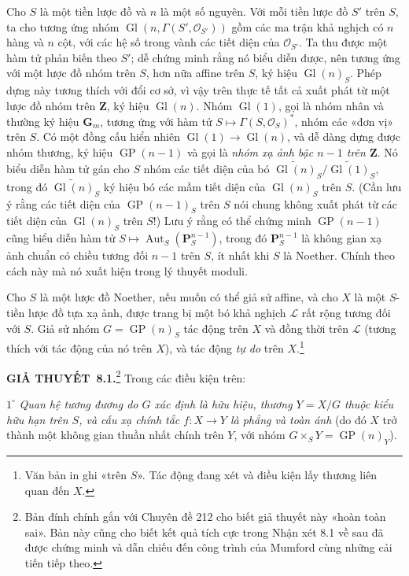 \documentclass[11pt,twoside,openany]{book}
\numberwithin{equation}{section}
\newcommand{\src}[1]{%
  \phantomsection\hypertarget{src:\fgasourceid:#1}{}%
  \marginpar{\raggedleft\footnotesize\sffamily #1}%
}
\newcommand{\fgasourceid}{unset}
\newcommand{\result}[2]{\par\medskip\noindent\textbf{#1\if\relax\detokenize{#2}\relax\else\ #2\fi.}\quad}
\begin{document}
Cho $S$ là một tiền lược đồ và $n$ là một số nguyên. Với mỗi tiền lược đồ $S'$
trên $S$, ta cho tương ứng nhóm
$\operatorname{Gl}(n,\Gamma(S',\mathcal O_{S'}))$ gồm các ma trận khả nghịch có
$n$ hàng và $n$ cột, với các hệ số trong vành các tiết diện của
$\mathcal O_{S'}$. Ta thu được một hàm tử phản biến theo $S'$; dễ chứng minh
rằng nó biểu diễn được, nên tương ứng với một lược đồ nhóm trên $S$, hơn nữa
affine trên $S$, ký hiệu $\operatorname{Gl}(n)_S$. Phép dựng này tương thích
với đổi cơ sở, vì vậy trên thực tế tất cả xuất phát từ một lược đồ nhóm trên
$\mathbf Z$, ký hiệu $\operatorname{Gl}(n)$. Nhóm $\operatorname{Gl}(1)$, gọi
là nhóm nhân và thường ký hiệu $\mathbf G_m$, tương ứng với hàm tử
$S\longmapsto\Gamma(S,\mathcal O_S)^*$, nhóm các «đơn vị» trên $S$. Có một
đồng cấu hiển nhiên $\operatorname{Gl}(1)\to\operatorname{Gl}(n)$, và dễ dàng
dựng được nhóm thương, ký hiệu $\operatorname{GP}(n-1)$ và gọi là
\emph{nhóm xạ ảnh bậc $n-1$ trên $\mathbf Z$}. Nó biểu diễn hàm tử gán cho
$S$ nhóm các tiết diện của bó
$\widetilde{\operatorname{Gl}(n)}_S/
\widetilde{\operatorname{Gl}(1)}_S$, trong đó
$\widetilde{\operatorname{Gl}(n)}_S$ ký hiệu bó các mầm tiết diện của
$\operatorname{Gl}(n)_S$ trên $S$. (Cần lưu ý rằng các tiết diện của
$\operatorname{GP}(n-1)_S$ trên $S$ nói chung không xuất phát từ các tiết diện
của $\operatorname{Gl}(n)_S$ trên $S$!) Lưu ý rằng có thể chứng minh
$\operatorname{GP}(n-1)$ cũng biểu diễn hàm tử
$S\longmapsto\operatorname{Aut}_S(\mathbf P_S^{n-1})$, trong đó
$\mathbf P_S^{n-1}$ là không gian xạ ảnh chuẩn có chiều tương đối $n-1$ trên
$S$, ít nhất khi $S$ là Noether. Chính theo cách này mà nó xuất hiện trong lý
thuyết moduli.

Cho $S$ là một lược đồ Noether, nếu muốn có thể giả sử affine, và cho $X$ là
một $S$-tiền lược đồ tựa xạ ảnh, được trang bị một bó khả nghịch $\mathcal L$
rất rộng tương đối với $S$. Giả sử nhóm $G=\operatorname{GP}(n)_S$ tác động
trên $X$ và đồng thời trên $\mathcal L$ (tương thích với tác động của nó trên
$X$), và tác động \emph{tự do} trên $X$.\footnote{Văn bản in ghi «trên $S$».
Tác động đang xét và điều kiện lấy thương liên quan đến $X$.}
\src{117}

\result{GIẢ THUYẾT}{8.1}\footnote{Bản đính chính gắn với Chuyên đề 212 cho
biết giả thuyết này «hoàn toàn sai». Bản này cũng cho biết kết quả tích cực
trong Nhận xét 8.1 về sau đã được chứng minh và dẫn chiếu đến công trình của Mumford
cùng những cải tiến tiếp theo.} Trong các điều kiện trên:

\smallskip
\noindent $1^\circ$ \emph{Quan hệ tương đương do $G$ xác định là hữu hiệu,
thương $Y=X/G$ thuộc kiểu hữu hạn trên $S$, và cấu xạ chính tắc $f:X\to Y$ là
phẳng và toàn ánh} (do đó $X$ trở thành một không gian thuần nhất chính trên
$Y$, với nhóm $G\times_S Y=\operatorname{GP}(n)_Y$).
\end{document}
